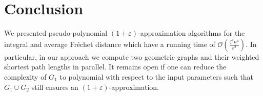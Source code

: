 \documentclass[a4paper,11pt]{article}
\begin{document}
\section{Conclusion}

	We presented pseudo-polynomial $(1+\varepsilon)$-approximation algorithms for the integral and average Fr\'{e}chet distance which have a running time of $\mathcal{O}(\frac{\zeta^4 n^4}{\varepsilon^2})$. In particular, in our approach we compute two geometric graphs and their weighted shortest path lengths in parallel. It remains open if one can reduce the complexity of $G_1$ to polynomial with respect to the input parameters such that  $G_1 \cup G_2$ still ensures an $(1+\varepsilon)$-approximation. 
	
\end{document}
